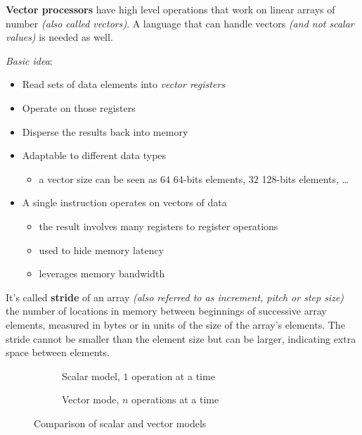 \documentclass[english]{article}
\begin{document}
\textbf{Vector processors} have high level operations that work on linear arrays of number \textit{(also called vectors)}.
A language that can handle vectors \textit{(and not scalar values)} is needed as well.

\textit{Basic idea}:
\begin{itemize}
  \item Read sets of data elements into \textit{vector registers}
  \item Operate on those registers
  \item Disperse the results back into memory
  \item Adaptable to different data types
        \begin{itemize}
          \item a vector size can be seen as \(64\) 64-bits elements, \(32\) 128-bits elements, \ldots
        \end{itemize}
  \item A single instruction operates on vectors of data
        \begin{itemize}
          \item the result involves many registers to register operations
          \item used to hide memory latency
          \item leverages memory bandwidth
        \end{itemize}
\end{itemize}

\bigskip
It's called \textbf{stride} of an array \textit{(also referred to as increment, pitch or step size)} the number of locations in memory between beginnings of successive array elements, measured in bytes or in units of the size of the array's elements. The stride cannot be smaller than the element size but can be larger, indicating extra space between elements.

\begin{figure}[htbp]
  \bigskip
  \centering
  \begin{subfigure}[b]{0.495\textwidth}
    \centering
    \caption{Scalar model, \(1\) operation at a time}
    \label{subfig:vector-model}
  \end{subfigure}
  \begin{subfigure}[b]{0.495\textwidth}
    \centering
    \caption{Vector mode, \(n\) operations at a time}
    \label{subfig:scalar-model}
  \end{subfigure}
  \caption{Comparison of scalar and vector models}
  \label{fig:comparison-of-models}
  \bigskip
\end{figure}
\end{document}
